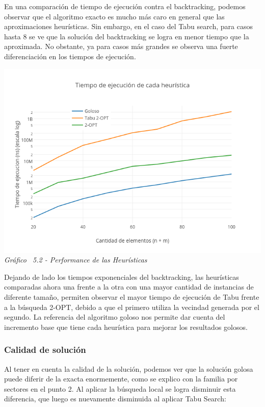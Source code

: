 En una comparación de tiempo de ejecución contra el backtracking, podemos observar que el algoritmo exacto es mucho más caro en general que las aproximaciones heurísticas. Sin embargo, en el caso del Tabu search, para casos hasta 8 se ve que la solución del backtracking se logra en menor tiempo que la aproximada. No obstante, ya para casos más grandes se observa una fuerte diferenciación en los tiempos de ejecución.

\vspace*{0.3cm} \vspace*{0.3cm}
  \begin{center}
 \includegraphics[scale=0.5]{./EJ5/medicion.png}\\
 {\textit{Gráfico \ 5.2 - Performance de las Heur\'isticas}}
  \end{center}
  \vspace*{0.3cm}

Dejando de lado los tiempos exponenciales del backtracking, las heurísticas comparadas ahora una frente a la otra con una mayor cantidad de instancias de diferente tamaño, permiten observar el mayor tiempo de ejecución de Tabu frente a la búsqueda 2-OPT, debido a que el primero utiliza la vecindad generada por el segundo. La referencia del algoritmo goloso nos permite dar cuenta del incremento base que tiene cada heurística para mejorar los resultados golosos.

\subsubsection*{Calidad de solución}

Al tener en cuenta la calidad de la solución, podemos ver que la solución golosa puede diferir de la exacta enormemente, como se explico con la familia por sectores en el punto 2. Al aplicar la búsqueda local se logra disminuir esta diferencia, que luego es nuevamente disminuida al aplicar Tabu Search:

